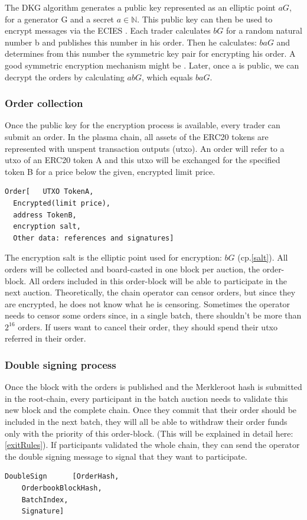 \documentclass[11pt,parskip=full]{scrartcl}%
\newcommand*{\erc}{ERC20 }
\begin{document}
The DKG algorithm generates a public key represented as an elliptic point $aG\label{public key}$, for a generator G and a secret $a\in \mathbb{N}$. 
This public key can then be used to encrypt messages via the ECIES \cite{ECIES}. 
Each trader calculates $bG \label{salt}$ for a random natural number b and publishes this number in his order. 
Then he calculates: $baG$ and determines from this number the symmetric key pair for encrypting his order. 
A good symmetric encryption mechanism might be \cite{cipher}.
Later, once a is public, we can decrypt the orders by calculating $abG$, which equals $baG$. 


\subsubsection{Order collection}
\label{orderblock}
Once the public key for the encryption process is available, every trader can submit an order. 
In the plasma chain, all assets of the ERC20 tokens are represented with unspent transaction outputs (utxo). 
An order will refer to a utxo of an \erc token A and this utxo will be exchanged for the specified token B for a price below the given, encrypted limit price. 
\begin{lstlisting}
Order[   UTXO TokenA,
  Encrypted(limit price),
  address TokenB,
  encryption salt,
  Other data: references and signatures]
\end{lstlisting} 
The encryption salt is the elliptic point used for encryption:  $bG$ (cp.\ref{salt}). 
All orders will be collected and board-casted in one block per auction, the order-block. 
All orders included in this order-block will be able to participate in the next auction. 
Theoretically, the chain operator can censor orders, but since they are encrypted, he does not know what he is censoring. 
Sometimes the operator needs to censor some orders since, in a single batch, there shouldn't be more than $2^{16}$ orders. 
If users want to cancel their order, they should spend their utxo referred in their order. 

\subsubsection{Double signing process}
Once the block with the orders is published and the Merkleroot hash is submitted in the root-chain, every participant in the batch auction needs to validate this new block and the complete chain. 
Once they commit that their order should be included in the next batch, they will all be able to withdraw their order funds only with the priority of this order-block. 
(This will be explained in detail here: \ref{exitRules}). 
If participants validated the whole chain, they can send the operator the double signing message to signal that they want to participate. 
\begin{lstlisting}
DoubleSign      [OrderHash,
    OrderbookBlockHash,
    BatchIndex,
    Signature]
\end{lstlisting}
\end{document}
